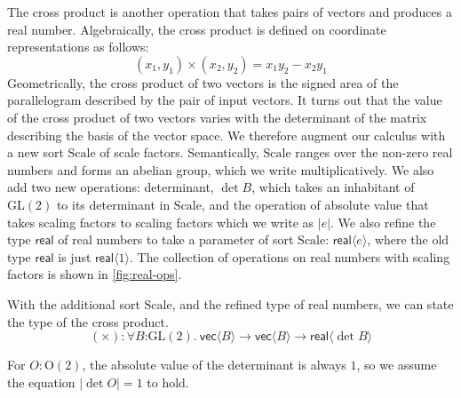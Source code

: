 \documentclass{article}
\newcommand{\GL}{\mathrm{GL}}
\newcommand{\Orth}{\mathrm{O}}
\newcommand{\Scale}{\mathrm{Scale}}
\begin{document}
The cross product is another operation that takes pairs of vectors and
produces a real number. Algebraically, the cross product is defined on
coordinate representations as follows:
\begin{displaymath}
  (x_1,y_1) \times (x_2,y_2) = x_1y_2 - x_2y_1
\end{displaymath}
Geometrically, the cross product of two vectors is the signed area of
the parallelogram described by the pair of input vectors. It turns out
that the value of the cross product of two vectors varies with the
determinant of the matrix describing the basis of the vector space. We
therefore augment our calculus with a new sort $\Scale$ of scale
factors. Semantically, $\Scale$ ranges over the non-zero real numbers
and forms an abelian group, which we write multiplicatively. We also
add two new operations: determinant, $\det B$, which takes an
inhabitant of $\GL(2)$ to its determinant in $\Scale$, and the
operation of absolute value that takes scaling factors to scaling
factors which we write as $|e|$. We also refine the type
$\mathsf{real}$ of real numbers to take a parameter of sort $\Scale$:
$\mathsf{real}\langle e \rangle$, where the old type $\mathsf{real}$
is just $\mathsf{real}\langle 1 \rangle$. The collection of operations
on real numbers with scaling factors is shown in
\autoref{fig:real-ops}.

With the additional sort $\Scale$, and the refined type of real
numbers, we can state the type of the cross product.
\begin{displaymath}
  (\times) : \forall B \mathord: \GL(2).\ \mathsf{vec}\langle B \rangle \to \mathsf{vec}\langle B \rangle \to \mathsf{real}\langle \det B \rangle
\end{displaymath}

For $O : \Orth(2)$, the absolute value of the determinant is always
$1$, so we assume the equation $|\det O| = 1$ to hold.
\end{document}
